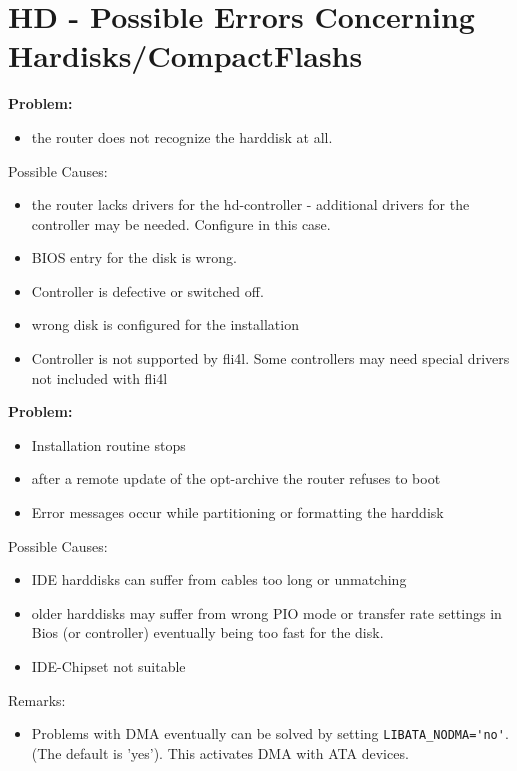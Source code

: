
{
  \section{HD - Possible Errors Concerning Hardisks/CompactFlashs}
}    
    \textbf{Problem:}

    \begin{itemize}
    \item the router does not recognize the harddisk at all.
    \end{itemize}

    Possible Causes:

    \begin{itemize}
    \item the router lacks drivers for the hd-controller - additional 
      drivers for the controller may be needed. Configure  
      in this case.
    \item BIOS entry for the disk is wrong.
    \item Controller is defective or switched off.
    \item wrong disk is configured for the installation 
    \item Controller is not supported by fli4l. Some controllers may 
      need special drivers not included with fli4l 
    \end{itemize}

    \textbf{Problem:}
    \begin{itemize}
    \item Installation routine stops
    \item after a remote update of the opt-archive the router refuses to boot
    \item Error messages occur while partitioning or formatting the harddisk
    \end{itemize}

    Possible Causes:
    \begin{itemize}
    \item IDE harddisks can suffer from cables too long or unmatching 
    \item older harddisks may suffer from wrong PIO mode or transfer rate settings 
      in Bios (or controller) eventually being too fast for the disk.
    \item IDE-Chipset not suitable
    \end{itemize}

    Remarks:
    \begin{itemize}
    \item Problems with DMA eventually can be solved by setting
      \verb*?LIBATA_NODMA='no'?. (The default is 'yes'). 
      This activates DMA with ATA devices.
    \end{itemize}

